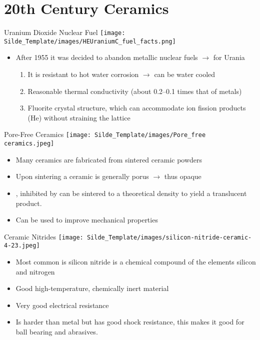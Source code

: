 \documentclass{libs/XJTLU_format}
\begin{document}
\section{20th Century Ceramics}

\begin{frame}{Uranium Dioxide Nuclear Fuel}
\centering
\texttt{[image: Silde\_Template/images/HEUraniumC\_fuel\_facts.png]}

\begin{itemize}
    \item After 1955 it was decided to abandon metallic nuclear fuels $\rightarrow$ for Urania \\
    \begin{enumerate}
        \item It is resistant to hot water corrosion $\rightarrow$ can be water cooled \pause
        \item Reasonable thermal conductivity (about 0.2–0.1 times
that of metals) \pause
\item Fluorite crystal structure, which can accommodate
ion fission products (He) without straining the lattice
    \end{enumerate}
\end{itemize}
    
\end{frame}

\begin{frame}{Pore-Free Ceramics}
\centering
\texttt{[image: Silde\_Template/images/Pore\_free ceramics.jpeg]}

    \begin{itemize}
    \item Many ceramics are fabricated from sintered ceramic powders \pause
    \item Upon sintering a ceramic is generally porus $\rightarrow$ thus opaque \pause
    \item {}, inhibited by  can be sintered to a theoretical density to yield a translucent product. \pause
    \item Can be used to improve mechanical properties
    \end{itemize}
\end{frame}

\begin{frame}{Ceramic Nitrides}
\centering
\texttt{[image: Silde\_Template/images/silicon-nitride-ceramic-4-23.jpeg]}

\begin{itemize}
    \item Most common is silicon nitride  is a chemical compound of the elements silicon and nitrogen \pause
    \item Good high-temperature, chemically inert material \pause
    \item Very good electrical resistance \pause
    \item Is harder than metal but has good shock resistance, this makes it good for ball bearing and abrasives.
\end{itemize}
    
\end{frame}
\end{document}

